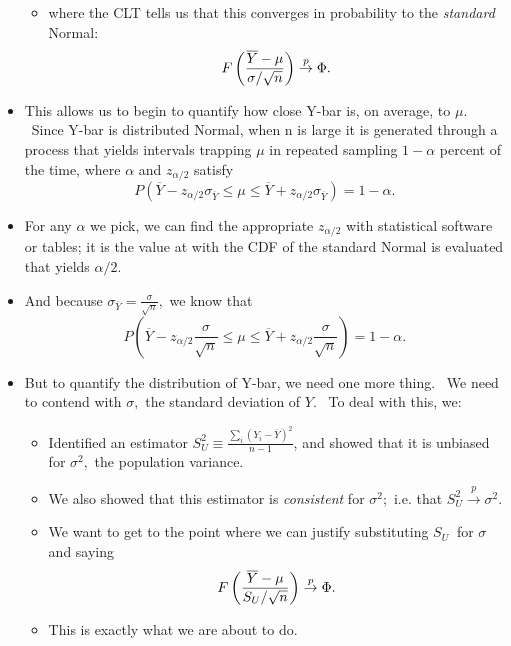 \documentclass[11pt]{article}
\begin{document}
\begin{itemize}
\begin{itemize}
\item where the CLT tells us that this converges in probability to the 
\textit{standard }Normal:%
\begin{equation*}
F\left( \frac{\overline{Y}-\mu }{\sigma /\sqrt{n}}\right) \overset{p}{%
\rightarrow }\Phi .
\end{equation*}
\end{itemize}

\item This allows us to begin to quantify how close Y-bar is, on average, to 
$\mu .$ \ Since Y-bar is distributed Normal, when n is large it is generated
through a process that yields intervals trapping $\mu $ in repeated sampling 
$1-\alpha $ percent of the time, where $\alpha $ and $z_{\alpha /2}$ satisfy%
\begin{equation*}
P(\overline{Y}-z_{\alpha /2}\sigma _{\overline{Y}}\leq \mu \leq \overline{Y}%
+z_{\alpha /2}\sigma _{\overline{Y}})=1-\alpha .
\end{equation*}

\item For any $\alpha $ we pick, we can find the appropriate $z_{\alpha /2}$
with statistical software or tables; it is the value at with the CDF of the
standard Normal is evaluated that yields $\alpha /2.$

\item And because $\sigma _{\overline{Y}}=\frac{\sigma }{\sqrt{n}},$ we know
that%
\begin{equation*}
P(\overline{Y}-z_{\alpha /2}\frac{\sigma }{\sqrt{n}}\leq \mu \leq \overline{Y%
}+z_{\alpha /2}\frac{\sigma }{\sqrt{n}})=1-\alpha .
\end{equation*}

\item But to quantify the distribution of Y-bar, we need one more thing. \
We need to contend with $\sigma ,$ the standard deviation of $Y$. \ To deal
with this, we:

\begin{itemize}
\item Identified an estimator $S_{U}^{2}\equiv \frac{\sum\nolimits_{i}\left(
Y_{i}-\overline{Y}\right) ^{2}}{n-1}$, and showed that it is unbiased for $%
\sigma ^{2},$ the population variance.

\item We also showed that this estimator is \textit{consistent }for $\sigma
^{2};$ i.e. that $S_{U}^{2}\overset{p}{\rightarrow }\sigma ^{2}.$ 

\item We want to get to the point where we can justify substituting $S_{U}\ $%
for $\sigma $ and saying%
\begin{equation*}
F\left( \frac{\overline{Y}-\mu }{S_{U}/\sqrt{n}}\right) \overset{p}{%
\rightarrow }\Phi .
\end{equation*}

\item This is exactly what we are about to do.
\end{itemize}
\end{itemize}
\end{document}
